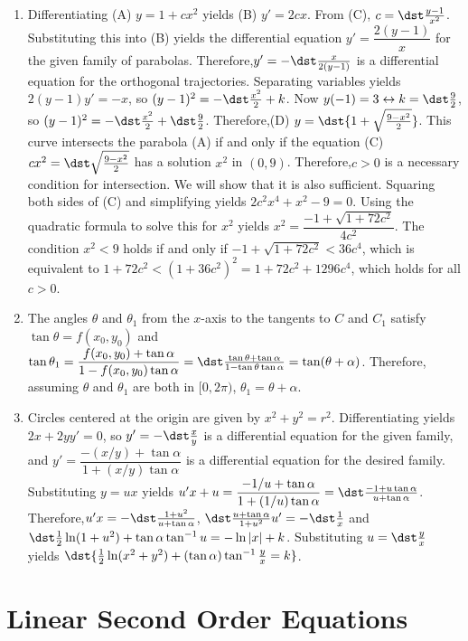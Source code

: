 \documentclass[openany]{book}
\newenvironment{sectionSolutions}{
 \begin{enumerate}[item-label={\thesection.\arabic{enumi}.}]
}{
 \end{enumerate}
}
\begin{document}
\begin{sectionSolutions}
\item
Differentiating (A) $y=1+cx^2$ yields (B) $y'=2cx$. From (C),
$c=\dst\frac{y-1}{ x^2}$. Substituting this into (B) yields the
differential equation $y'=\dfrac{2(y-1)}{ x}$ for the given family of
parabolas. Therefore,$y'=-\dst\frac{x}{2(y-1)}$ is a differential
equation for the orthogonal trajectories. Separating variables yields
$2(y-1)y'=-x$, so $(y-1)^2=-\dst\frac{x^2}{2}+k$. Now
$y(-1)=3\leftrightarrow k=\dst\frac{9}{2}$, so
$(y-1)^2=-\dst\frac{x^2}{2}+\dst\frac{9}{2}$. Therefore,(D)
$y=\dst{1+\sqrt\frac{9-x^2}{2}}$. This curve intersects the parabola
(A) if and only if the equation (C) $cx^2=\dst\sqrt\frac{9-x^2}{2}$ has
a solution $x^2$ in $(0,9)$. Therefore,$c>0$ is a necessary condition
for intersection. We will show that it is also sufficient. Squaring
both sides of (C) and simplifying yields $2c^2x^4+x^2-9=0$. Using the
quadratic formula to solve this for $x^2$ yields
$x^2=\dfrac{-1+\sqrt{1+72c^2}}{4c^2}$. The condition $x^2<9$ holds if
and only if $-1+\sqrt{1+72c^2}<36c^4$, which is equivalent to
$1+72c^2<(1+36c^2)^2=1+72c^2+1296c^4$, which holds for all $c>0$.


\item
The angles $\theta$ and $\theta_1$  from the $x$-axis to the tangents
to $C$ and $C_1$ satisfy $\tan\theta=f(x_0,y_0)$ and
$\tan\theta_1=\dfrac{f(x_0,y_0)+\tan\alpha}{1-f(x_0,y_0)\tan\alpha}=
\dst\frac{\tan\theta+\tan\alpha}{1-\tan\theta\tan\alpha}=\tan(\theta+\alpha)$.
Therefore, assuming $\theta$ and $\theta_1$ are both in $[0,2\pi)$,
$\theta_1=\theta+\alpha$.

\item
Circles centered at the origin are given by $x^2+y^2=r^2$.
Differentiating yields $2x+2yy'=0$, so $y'=-\dst\frac{x}{ y}$ is a
differential equation for the given family, and
$y'=\dfrac{-(x/y)+\tan\alpha}{1+(x/y)\tan\alpha}$ is a differential
equation for the desired family. Substituting $y=ux$ yields
$u'x+u=\dfrac{-1/u+\tan\alpha}{1+(1/u)\tan\alpha}=\dst\frac{-1+u\tan\alpha}{
u+\tan\alpha}$. Therefore,$u'x=-\dst\frac{1+u^2}{ u+\tan\alpha}$,
$\dst\frac{u+\tan\alpha}{ 1+u^2}u'=-\dst\frac{1}{ x}$ and
$\dst\frac{1}{2}\ln(1+u^2)+\tan\alpha\tan^{-1}u=-\ln|x|+k$. Substituting
$u=\dst\frac{y}{ x}$ yields $\dst{\frac{1}{2}\ln (x^2+y^2)+(\tan\alpha)
\tan^{-1}\frac{y}{ x}=k}$.
\end{sectionSolutions}

\chapter{Linear Second Order Equations}
\end{document}
